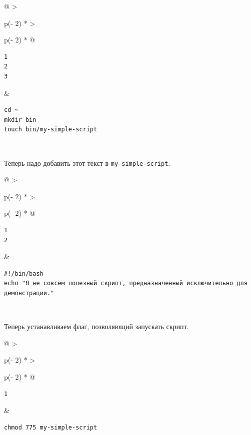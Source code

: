\documentclass{report}
\begin{document}
\begin{longtable}[]{@{}
  >{\raggedright\arraybackslash}p{(\columnwidth - 2\tabcolsep) * }
  >{\raggedright\arraybackslash}p{(\columnwidth - 2\tabcolsep) * }@{}}
\toprule
\endhead
\begin{minipage}[t]{\linewidth}\raggedright
\begin{verbatim}
1
2
3
\end{verbatim}
\end{minipage} & \begin{minipage}[t]{\linewidth}\raggedright
\begin{verbatim}
cd ~
mkdir bin
touch bin/my-simple-script
\end{verbatim}
\end{minipage} \\ \addlinespace
\bottomrule
\end{longtable}

Теперь надо добавить этот текст в \texttt{my-simple-script}.

\begin{longtable}[]{@{}
  >{\raggedright\arraybackslash}p{(\columnwidth - 2\tabcolsep) * }
  >{\raggedright\arraybackslash}p{(\columnwidth - 2\tabcolsep) * }@{}}
\toprule
\endhead
\begin{minipage}[t]{\linewidth}\raggedright
\begin{verbatim}
1
2
\end{verbatim}
\end{minipage} & \begin{minipage}[t]{\linewidth}\raggedright
\begin{verbatim}
#!/bin/bash
echo "Я не совсем полезный скрипт, предназначенный исключительно для демонстрации."
\end{verbatim}
\end{minipage} \\ \addlinespace
\bottomrule
\end{longtable}

Теперь устанавливаем флаг, позволяющий запускать скрипт.

\begin{longtable}[]{@{}
  >{\raggedright\arraybackslash}p{(\columnwidth - 2\tabcolsep) * }
  >{\raggedright\arraybackslash}p{(\columnwidth - 2\tabcolsep) * }@{}}
\toprule
\endhead
\begin{minipage}[t]{\linewidth}\raggedright
\begin{verbatim}
1
\end{verbatim}
\end{minipage} & \begin{minipage}[t]{\linewidth}\raggedright
\begin{verbatim}
chmod 775 my-simple-script
\end{verbatim}
\end{minipage} \\ \addlinespace
\bottomrule
\end{longtable}
\end{document}
